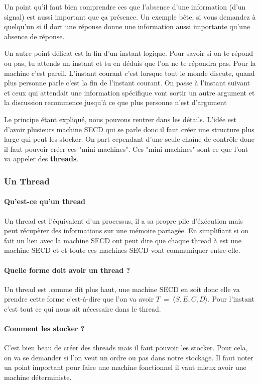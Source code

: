 \documentclass[10pt,a4paper]{article}
\begin{document}
			Un point qu'il faut bien comprendre ces que l'absence d'une information (d'un signal) est aussi important que ça présence. Un exemple bête, si vous demandez à quelqu'un si il dort une réponse donne une information aussi importante qu'une absence de réponse.
			\medbreak
				
			Un autre point délicat est la fin d'un instant logique. Pour savoir si on te répond ou pas, tu attends un instant et tu en déduis que l'on ne te répondra pas. Pour la machine c'est pareil. L'instant courant c'est lorsque tout le monde discute, quand plus personne parle c'est la fin de l'instant courant. On passe à l'instant suivant et ceux qui attendait une information spécifique vont sortir un autre argument et la discussion recommence jusqu'à ce que plus personne n'est d'argument
			\medbreak
				
			Le principe étant expliqué, nous pouvons rentrer dans les détails. L'idée est d'avoir plusieurs machine SECD qui se parle donc il faut créer une structure plus large qui peut les stocker. On part cependant d'une seule chaîne de contrôle donc il faut pouvoir créer ces "mini-machines". Ces "mini-machines" sont ce que l'ont va appeler des \textbf{threads}.
			\bigbreak
				
				
			\subsubsection{Un Thread}
					
				\paragraph{Qu'est-ce qu'un thread}
				Un thread est l'équivalent d'un processus, il a sa propre pile d'éxécution mais peut récupèrer des informations sur une mémoire partagée. En simplifiant si on fait un lien avec la machine SECD ont peut dire que chaque thread à est une machine SECD et et toute ces machines SECD vont communiquer entre-elle.
					
				\paragraph{Quelle forme doit avoir un thread ?} 
				Un thread est ,comme dit plus haut, une machine SECD en soit donc elle va prendre cette forme c'est-à-dire que l'on va avoir $T~=~\langle S,E,C,D\rangle$. Pour l'instant c'est tout ce qui nous ait nécessaire dans le thread.
					
				\paragraph{Comment les stocker ?}
				C'est bien beau de créer des threads mais il faut pouvoir les stocker. Pour cela, on va se demander si l'on veut un ordre ou pas dans notre stockage. Il faut noter un point important pour faire une machine fonctionnel il vaut mieux avoir une machine déterministe.
				\medbreak
					
\end{document}
